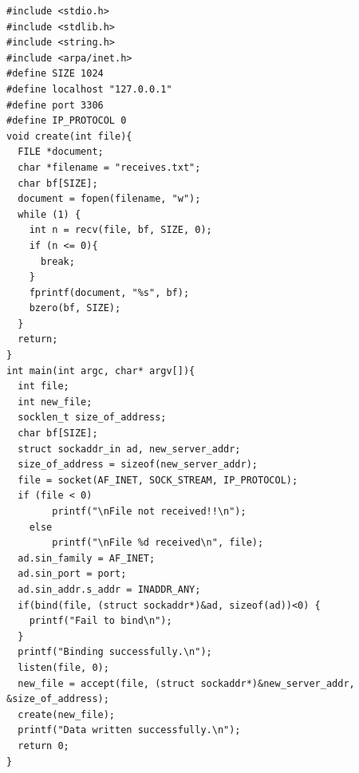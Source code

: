 \documentclass[12pt]{article}
\begin{document}
\begin{verbatim}
#include <stdio.h>
#include <stdlib.h>
#include <string.h>
#include <arpa/inet.h>
#define SIZE 1024
#define localhost "127.0.0.1"
#define port 3306
#define IP_PROTOCOL 0
void create(int file){
  FILE *document;
  char *filename = "receives.txt";
  char bf[SIZE];
  document = fopen(filename, "w");
  while (1) {
    int n = recv(file, bf, SIZE, 0);
    if (n <= 0){
      break;
    }
    fprintf(document, "%s", bf);
    bzero(bf, SIZE);
  }
  return;
}
int main(int argc, char* argv[]){
  int file;
  int new_file;
  socklen_t size_of_address;
  char bf[SIZE];
  struct sockaddr_in ad, new_server_addr;
  size_of_address = sizeof(new_server_addr);
  file = socket(AF_INET, SOCK_STREAM, IP_PROTOCOL);
  if (file < 0)
        printf("\nFile not received!!\n");
    else
        printf("\nFile %d received\n", file);
  ad.sin_family = AF_INET;
  ad.sin_port = port;
  ad.sin_addr.s_addr = INADDR_ANY;
  if(bind(file, (struct sockaddr*)&ad, sizeof(ad))<0) {
    printf("Fail to bind\n");
  }
  printf("Binding successfully.\n");
  listen(file, 0);
  new_file = accept(file, (struct sockaddr*)&new_server_addr, &size_of_address);
  create(new_file);
  printf("Data written successfully.\n");
  return 0;
}
\end{verbatim}
\end{document}
